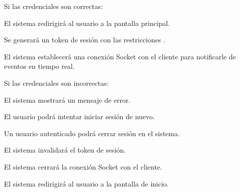 \begin{RFGestionUsuarios}
\begin{RFGestionUsuarios}
      \item Si las credenciales son correctas:
		\begin{RFGestionUsuarios}
			\item El sistema redirigirá al usuario a la pantalla principal.
			\item Se generará un token de sesión con las restricciones .
			\item El sistema establecerá una conexión Socket con el cliente para notificarle de eventos en tiempo real.
		\end{RFGestionUsuarios}
	  \item Si las credenciales son incorrectas:
		\begin{RFGestionUsuarios}
			\item El sistema mostrará un mensaje de error.
			\item El usuario podrá intentar iniciar sesión de nuevo.
		\end{RFGestionUsuarios}
    \end{RFGestionUsuarios}

	\item Un usuario autenticado podrá cerrar sesión en el sistema.\label{req_cerrar_sesion}
	\begin{RFGestionUsuarios}
		\item El sistema invalidará el token de sesión.
		\item El sistema cerrará la conexión Socket con el cliente.
		\item El sistema redirigirá al usuario a la pantalla de inicio.
	\end{RFGestionUsuarios}

\end{RFGestionUsuarios}